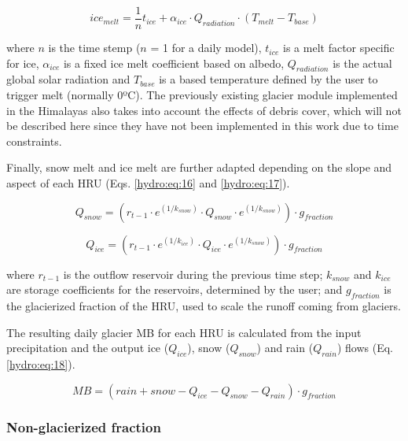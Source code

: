 \begin{equation} \label{hydro:eq:15}
ice_{melt} = \frac{1}{n}t_{ice} + \alpha_{ice } \cdot Q_{radiation} \cdot(T_{melt} - T_{base})
\end{equation} 

where $n$ is the time stemp ($n$ = 1 for a daily model), $t_{ice}$ is a melt factor specific for ice, $\alpha_{ice}$ is a fixed ice melt coefficient based on albedo, $Q_{radiation}$ is the actual global solar radiation and $T_{base}$ is a based temperature defined by the user to trigger melt (normally 0ºC). The previously existing glacier module implemented in the Himalayas also takes into account the effects of debris cover, which will not be described here since they have not been implemented in this work due to time constraints. 

Finally, snow melt and ice melt are further adapted depending on the slope and aspect of each HRU (Eqs. \ref{hydro:eq:16} and \ref{hydro:eq:17}).

\begin{equation} \label{hydro:eq:16}
Q_{snow} = (r_{t-1 }\cdot e^{(1/k_{snow})} \cdot Q_{snow} \cdot e^{(1/k_{snow})}) \cdot g_{fraction}
\end{equation} 

\begin{equation} \label{hydro:eq:17}
Q_{ice} = (r_{t-1} \cdot e^{(1/k_{ice})} \cdot Q_{ice} \cdot e^{(1/k_{snow})}) \cdot g_{fraction}
\end{equation} 

where $r_{t-1}$ is the outflow reservoir during the previous time step; $k_{snow}$ and $k_{ice}$ are storage coefficients for the reservoirs, determined by the user; and $g_{fraction}$ is the glacierized fraction of the HRU, used to scale the runoff coming from glaciers. 

The resulting daily glacier MB for each HRU is calculated from the input precipitation and the output ice ($Q_{ice}$), snow ($Q_{snow}$) and rain ($Q_{rain}$) flows (Eq. \ref{hydro:eq:18}).

\begin{equation} \label{hydro:eq:18}
MB = (rain + snow - Q_{ice} - Q_{snow} - Q_{rain}) \cdot g_{fraction}
\end{equation} 

\subsubsection{Non-glacierized fraction}

